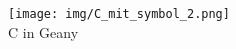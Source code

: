 \begin{frame}
	\begin{figure}
		\texttt{[image: img/C\_mit\_symbol\_2.png]}\\
		\tiny C in Geany
	\end{figure}
\end{frame}
